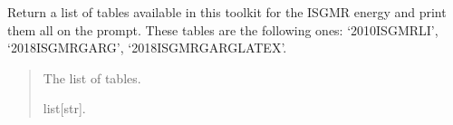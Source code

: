 \documentclass[letterpaper,10pt,english]{sphinxmanual}
\begin{document}
\begin{fulllineitems}
\label{\detokenize{source/api/setup_nuc_isgmr_exp:nucleardatapy.nuc.setup_isgmr_exp.isgmr_exp_tables}}
\pysigstartsignatures
{}
\pysigstopsignatures
\sphinxAtStartPar
Return a list of tables available in this toolkit for the ISGMR energy and
print them all on the prompt. These tables are the following
ones: ‘2010\sphinxhyphen{}ISGMR\sphinxhyphen{}LI’, ‘2018\sphinxhyphen{}ISGMR\sphinxhyphen{}GARG’, ‘2018\sphinxhyphen{}ISGMR\sphinxhyphen{}GARG\sphinxhyphen{}LATEX’.
\begin{quote}\begin{description}
\sphinxAtStartPar
The list of tables.

\sphinxAtStartPar
list{[}str{]}.

\end{description}\end{quote}

\end{fulllineitems}

\end{document}
